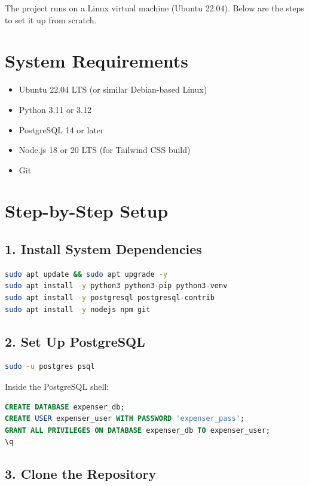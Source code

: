 \documentclass[12pt,a4paper]{report}
\begin{document}
The project runs on a Linux virtual machine (Ubuntu 22.04). Below are the steps to set it up from scratch.

\section{System Requirements}

\begin{itemize}
  \item Ubuntu 22.04 LTS (or similar Debian-based Linux)
  \item Python 3.11 or 3.12
  \item PostgreSQL 14 or later
  \item Node.js 18 or 20 LTS (for Tailwind CSS build)
  \item Git
\end{itemize}

\section{Step-by-Step Setup}

\subsection{1. Install System Dependencies}

\begin{lstlisting}[language=bash]
sudo apt update && sudo apt upgrade -y
sudo apt install -y python3 python3-pip python3-venv
sudo apt install -y postgresql postgresql-contrib
sudo apt install -y nodejs npm git
\end{lstlisting}

\subsection{2. Set Up PostgreSQL}

\begin{lstlisting}[language=bash]
sudo -u postgres psql
\end{lstlisting}

Inside the PostgreSQL shell:

\begin{lstlisting}[language=SQL]
CREATE DATABASE expenser_db;
CREATE USER expenser_user WITH PASSWORD 'expenser_pass';
GRANT ALL PRIVILEGES ON DATABASE expenser_db TO expenser_user;
\q
\end{lstlisting}

\subsection{3. Clone the Repository}
\end{document}
